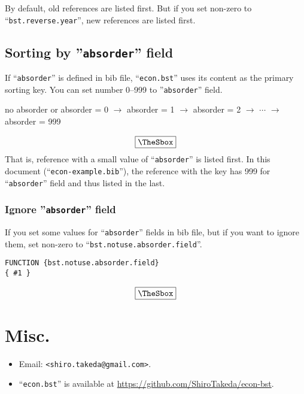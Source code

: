 \documentclass[10pt]{article}
\newenvironment{Frame}%
{\setlength{\fboxsep}{15pt}
\setlength{\mylength}{\linewidth}%
\addtolength{\mylength}{-2\fboxsep}%
\addtolength{\mylength}{-2\fboxrule}%
\Sbox
\minipage{\mylength}%
\setlength{\abovedisplayskip}{0pt}%
\setlength{\belowdisplayskip}{0pt}%
}%
{\endminipage\endSbox
\[\fbox{\TheSbox}\]}
\begin{document}
By default, old references are listed first.  But if you set non-zero to
``\texttt{bst.reverse.year}'', new references are listed first.

\subsection{Sorting by ''\texttt{absorder}'' field}

If ``\texttt{absorder}'' is defined in bib file,
``\texttt{econ.bst}'' uses its content as the primary sorting key.
You can set number 0--999 to ''\texttt{absorder}'' field.

\begin{Frame}
\begin{center}
 no absorder or absorder = 0  $\rightarrow$ absorder = 1 $\rightarrow$ absorder = 2
 $\rightarrow$ $\cdots$ $\rightarrow$ absorder = 999
\end{center}
\end{Frame}
That is, reference with a small value of ``\texttt{absorder}'' is listed
first.  In this document (``\texttt{econ-example.bib}''), the reference
with the key \citet{takeda10:_cge_analy_welfar_effec_trade} has 999 for
``\texttt{absorder}'' field and thus listed in the last.


\subsubsection{Ignore ''\texttt{absorder}'' field}

If you set some values for ``\texttt{absorder}'' fields in bib file,
but if you want to ignore them, set non-zero to
``\texttt{bst.notuse.absorder.field}''.
\begin{Frame}
\begin{verbatim}
FUNCTION {bst.notuse.absorder.field}
{ #1 }
\end{verbatim}
\end{Frame}

\section{Misc.}

\begin{itemize}
 \item Email: \verb|<shiro.takeda@gmail.com>|.
 \item ``\texttt{econ.bst}'' is available at \url{https://github.com/ShiroTakeda/econ-bst}.
\end{itemize}
\vspace*{1em}
\end{document}
